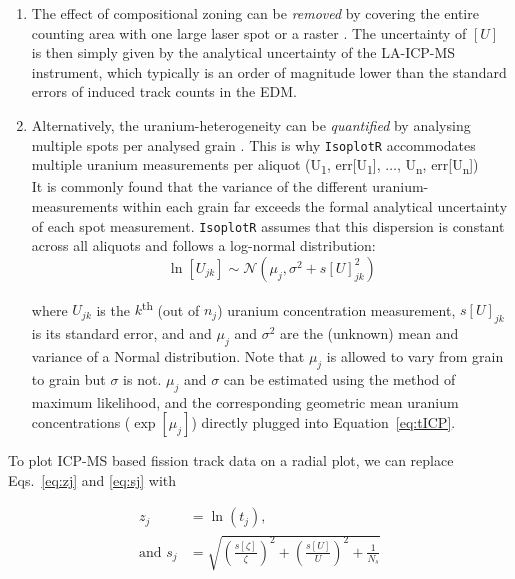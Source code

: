 \begin{refsection}
\begin{enumerate}
\item The effect of compositional zoning can be \emph{removed} by
  covering the entire counting area with one large laser spot
  \citep{soares2014} or a raster \citep{hasebe2004}. The uncertainty
  of $[{U}]$ is then simply given by the analytical uncertainty of the
  LA-ICP-MS instrument, which typically is an order of magnitude lower
  than the standard errors of induced track counts in the EDM.
\item Alternatively, the uranium-heterogeneity can be
  \emph{quantified} by analysing multiple spots per analysed grain
  \citep{hasebe2009}. This is why \texttt{IsoplotR} accommodates
  multiple uranium measurements per aliquot (U\textsubscript{1},
  err[U\textsubscript{1}], $\ldots$, U\textsubscript{n},
  err[U\textsubscript{n}])\\

  It is commonly found that the variance of the different
  uranium-measurements within each grain far exceeds the formal
  analytical uncertainty of each spot measurement. \texttt{IsoplotR}
  assumes that this dispersion is constant across all aliquots and
  follows a log-normal distribution:
  \begin{equation}
    \ln[U_{jk}] \sim \mathcal{N}(\mu_j,\sigma^2+s[U]_{jk}^2)
    \label{eq:lognorm}
  \end{equation}

  where ${U}_{jk}$ is the $k$\textsuperscript{th} (out of $n_j$)
  uranium concentration measurement, $s[U]_{jk}$ is its standard
  error, and and $\mu_j$ and $\sigma^2$ are the (unknown) mean and
  variance of a Normal distribution. Note that $\mu_j$ is allowed to
  vary from grain to grain but $\sigma$ is not.  $\mu_j$ and $\sigma$
  can be estimated using the method of maximum likelihood, and the
  corresponding geometric mean uranium concentrations ($\exp[\mu_j]$)
  directly plugged into Equation~\ref{eq:tICP}.
\end{enumerate}

To plot ICP-MS based fission track data on a radial plot, we can
replace Eqs.~\ref{eq:zj} and \ref{eq:sj} with

\begin{align}
  z_j & = \ln ({t}_j) \mbox{,}   \label{eq:zj2} \\
  \mbox{and~} s_j & = \sqrt{ 
    \left(\frac{s[{\zeta}]}{{\zeta}}\right)^2 +
    \left(\frac{s[{U}]}{{U}}\right)^2 +
    \frac{1}{N_s}
  }   \label{eq:sj2}
\end{align}


\end{refsection}

